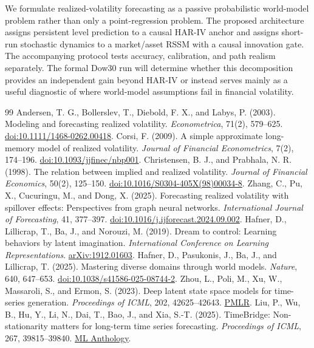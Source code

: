 \documentclass[11pt]{article}
\begin{document}
We formulate realized-volatility forecasting as a passive probabilistic world-model problem rather than only a point-regression problem. The proposed architecture assigns persistent level prediction to a causal HAR-IV anchor and assigns short-run stochastic dynamics to a market/asset RSSM with a causal innovation gate. The accompanying protocol tests accuracy, calibration, and path realism separately. The formal Dow30 run will determine whether this decomposition provides an independent gain beyond HAR-IV or instead serves mainly as a useful diagnostic of where world-model assumptions fail in financial volatility.

\begin{thebibliography}{99}
 Andersen, T. G., Bollerslev, T., Diebold, F. X., and Labys, P. (2003). Modeling and forecasting realized volatility. \emph{Econometrica}, 71(2), 579--625. \href{https://doi.org/10.1111/1468-0262.00418}{doi:10.1111/1468-0262.00418}.
 Corsi, F. (2009). A simple approximate long-memory model of realized volatility. \emph{Journal of Financial Econometrics}, 7(2), 174--196. \href{https://doi.org/10.1093/jjfinec/nbp001}{doi:10.1093/jjfinec/nbp001}.
 Christensen, B. J., and Prabhala, N. R. (1998). The relation between implied and realized volatility. \emph{Journal of Financial Economics}, 50(2), 125--150. \href{https://doi.org/10.1016/S0304-405X(98)00034-8}{doi:10.1016/S0304-405X(98)00034-8}.
 Zhang, C., Pu, X., Cucuringu, M., and Dong, X. (2025). Forecasting realized volatility with spillover effects: Perspectives from graph neural networks. \emph{International Journal of Forecasting}, 41, 377--397. \href{https://doi.org/10.1016/j.ijforecast.2024.09.002}{doi:10.1016/j.ijforecast.2024.09.002}.
 Hafner, D., Lillicrap, T., Ba, J., and Norouzi, M. (2019). Dream to control: Learning behaviors by latent imagination. \emph{International Conference on Learning Representations}. \href{https://arxiv.org/abs/1912.01603}{arXiv:1912.01603}.
 Hafner, D., Pasukonis, J., Ba, J., and Lillicrap, T. (2025). Mastering diverse domains through world models. \emph{Nature}, 640, 647--653. \href{https://doi.org/10.1038/s41586-025-08744-2}{doi:10.1038/s41586-025-08744-2}.
 Zhou, L., Poli, M., Xu, W., Massaroli, S., and Ermon, S. (2023). Deep latent state space models for time-series generation. \emph{Proceedings of ICML}, 202, 42625--42643. \href{https://proceedings.mlr.press/v202/zhou23i.html}{PMLR}.
 Liu, P., Wu, B., Hu, Y., Li, N., Dai, T., Bao, J., and Xia, S.-T. (2025). TimeBridge: Non-stationarity matters for long-term time series forecasting. \emph{Proceedings of ICML}, 267, 39815--39840. \href{https://mlanthology.org/icml/2025/liu2025icml-timebridge/}{ML Anthology}.

\end{thebibliography}
\end{document}
